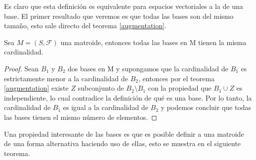 Es claro que esta definición es equivalente para espacios vectoriales a la de una base. El primer resultado que veremos es que todas las bases son del mismo tamaño, esto sale directo del teorema \ref{augmentation}. 

\begin{cor} \label{cor bases}
Sea $M=(S,\mathcal{F})$ una matroide, entonces todas las bases en M tienen la misma cardinalidad.
\end{cor}
\begin{proof}
Sean $B_1$ y $B_2$ dos bases en M y supongamos que la cardinalidad de $B_1$ es estrictamente menor a la cardinalidad de $B_2$, entonces por el teorema \ref{augmentation} existe $Z$ subconjunto de $B_2 \setminus B_1$ con la propiedad que $B_1 \cup Z$ es independiente, lo cual contradice la definición de qué es una base. Por lo tanto, la cardinalidad de $B_1$ es igual a la cardinalidad de $B_2$ y podemos concluir que todas las bases tienen el mismo número de elementos. 
\end{proof}

Una propiedad interesante de las bases es que es posible definir a una matroide de una forma alternativa haciendo uso de ellas, esto se muestra en el siguiente teorema. 


